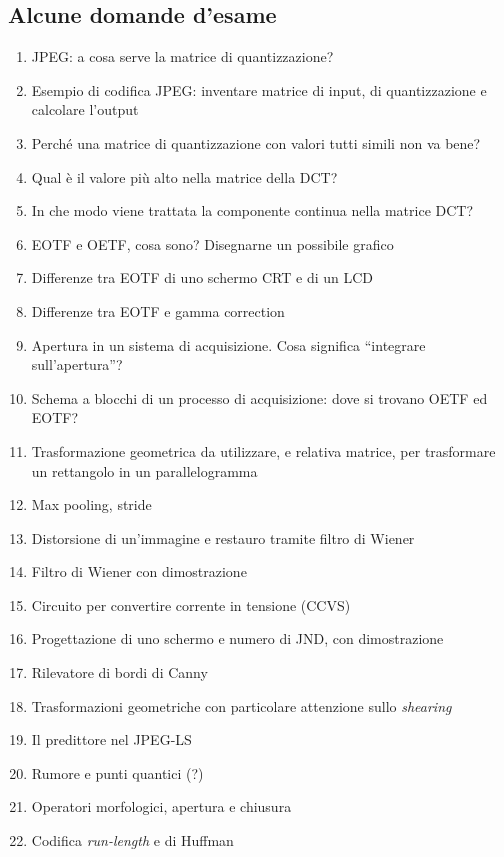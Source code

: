 \documentclass[a4paper,11pt]{article}
\begin{document}
\begin{appendices}
\section{Alcune domande d'esame}
\begin{enumerate}
    \item JPEG: a cosa serve la matrice di quantizzazione?
    \item Esempio di codifica JPEG: inventare matrice di input, di quantizzazione e calcolare l'output
    \item Perché una matrice di quantizzazione con valori tutti simili non va bene?
    \item Qual è il valore più alto nella matrice della DCT?
    \item In che modo viene trattata la componente continua nella matrice DCT?
    \item EOTF e OETF, cosa sono? Disegnarne un possibile grafico
    \item Differenze tra EOTF di uno schermo CRT e di un LCD
    \item Differenze tra EOTF e gamma correction
    \item Apertura in un sistema di acquisizione. Cosa significa ``integrare sull'apertura''?
    \item Schema a blocchi di un processo di acquisizione: dove si trovano OETF ed EOTF?
    \item Trasformazione geometrica da utilizzare, e relativa matrice, per trasformare un rettangolo in un parallelogramma
    \item Max pooling, stride
    \item Distorsione di un'immagine e restauro tramite filtro di Wiener
    \item Filtro di Wiener con dimostrazione
    \item Circuito per convertire corrente in tensione (CCVS)
    \item Progettazione di uno schermo e numero di JND, con dimostrazione
    \item Rilevatore di bordi di Canny
    \item Trasformazioni geometriche con particolare attenzione sullo \textit{shearing}
    \item Il predittore nel JPEG-LS
    \item Rumore e punti quantici (?)
    \item Operatori morfologici, apertura e chiusura
    \item Codifica \textit{run-length} e di Huffman

\end{enumerate}
\end{appendices}
\end{document}
